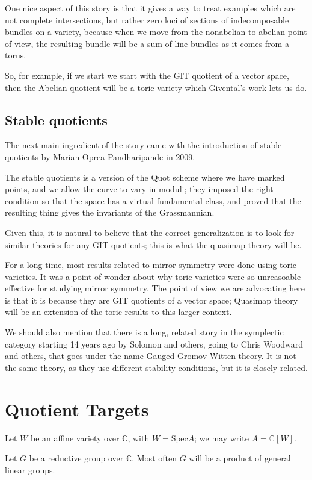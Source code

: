 \documentclass{amsart}
\theoremstyle{definition}
\newcommand{\C}{\mathbb{C}}
\newcommand{\Quot}{\text{Quot}}
\begin{document}
One nice aspect of this story is that it gives a way to treat examples which are not complete intersections, but rather zero loci of sections of indecomposable bundles on a variety, because when we move from the nonabelian to abelian point of view, the resulting bundle will be a sum of line bundles as it comes from a torus.

So, for example, if we start we start with the GIT quotient of a vector space, then the Abelian quotient will be a toric variety which Givental's work lets us do.

\subsection{Stable quotients}
The next main ingredient of the story came with the introduction of stable quotients by Marian-Oprea-Pandharipande in 2009.

The stable quotients is a version of the $\Quot$ scheme where we have marked points, and we allow the curve to vary in moduli; they imposed the right condition so that the space has a virtual fundamental class, and proved that the resulting thing gives the invariants of the Grassmannian.

Given this, it is natural to believe that the correct generalization is to look for similar theories for any GIT quotients; this is what the quasimap theory will be.

For a long time, most results related to mirror symmetry were done using toric varieties.  It was a point of wonder about why toric varieties were so unreasoable effective for studying mirror symmetry.  The point of view we are advocating here is that it is because they are GIT quotients of a vector space; Quasimap theory will be an extension of the toric results to this larger context.

We should also mention that there is a long, related story in the symplectic category starting 14 years ago by Solomon and others, going to Chris Woodward and others, that goes under the name Gauged Gromov-Witten theory.  It is not the same theory, as they use different stability conditions, but it is closely related.

\section{Quotient Targets}
Let $W$ be an affine variety over $\C$, with $W=\text{Spec} A$; we may write $A=\C[W]$.

Let $G$ be a reductive group over $\C$.  Most often $G$ will be a product of general linear groups.
\end{document}
